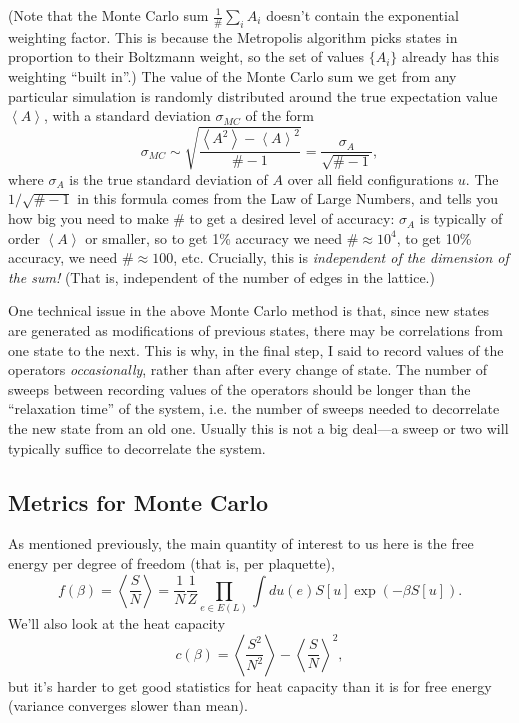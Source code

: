 \documentclass[9pt,twocolumn,twoside]{article}
\begin{document}
(Note that the Monte Carlo sum $\frac{1}{\#} \sum_i A_i$ doesn't contain the exponential weighting factor.  This is because the Metropolis algorithm picks states in proportion to their Boltzmann weight, so the set of values $\{A_i\}$ already has this weighting ``built in''.)  The value of the Monte Carlo sum we get from any particular simulation is randomly distributed around the true expectation value $\left<A\right>$, with a standard deviation $\sigma_{MC}$ of the form 
\begin{equation}
\sigma_{MC} \sim \sqrt{\frac{\left<A^2\right>-\left<A\right>^2}{\#-1}} = \frac{\sigma_A}{\sqrt{\#-1}},
\end{equation}
where $\sigma_A$ is the true standard deviation of $A$ over all field configurations $u$.  The $1/\sqrt{\#-1}$ in this formula comes from the Law of Large Numbers, and tells you how big you need to make $\#$ to get a desired level of accuracy:  $\sigma_A$ is typically of order $\left<A\right>$ or smaller, so to get 1\% accuracy we need $\# \approx 10^4$, to get 10\% accuracy, we need $\#\approx 100$, etc.  Crucially, this is \textit{independent of the dimension of the sum!}  (That is, independent of the number of edges in the lattice.)

One technical issue in the above Monte Carlo method is that, since new states are generated as modifications of previous states, there may be correlations from one state to the next.  This is why, in the final step, I said to record values of the operators \textit{occasionally}, rather than after every change of state.  The number of sweeps between recording values of the operators should be longer than the ``relaxation time'' of the system, i.e. the number of sweeps needed to decorrelate the new state from an old one.  Usually this is not a big deal---a sweep or two will typically suffice to decorrelate the system.  

\subsection{Metrics for Monte Carlo}
As mentioned previously, the main quantity of interest to us here is the free energy per degree of freedom (that is, per plaquette),
\[f(\beta) = \left<\frac{S}{N}\right> = \frac{1}{N}\frac{1}{Z} \prod_{e\in E(L)} \int du(e) S[u] \exp(-\beta S[u]). \]
We'll also look at the heat capacity 
\[c(\beta) = \left<\frac{S^2}{N^2}\right> - \left< \frac{S}{N}\right>^2,\]
but it's harder to get good statistics for heat capacity than it is for free energy (variance converges slower than mean).  
\end{document}
